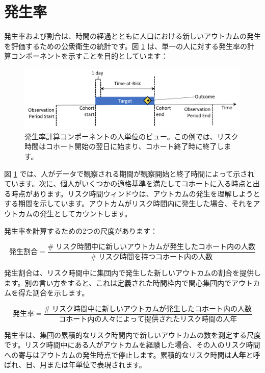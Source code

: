 \documentclass[
  11pt]{book}
\theoremstyle{definition}
\theoremstyle{definition}
\theoremstyle{definition}
\theoremstyle{definition}
\theoremstyle{remark}
\begin{document}
\section{発生率}\label{ux767aux751fux7387}

発生率および割合は、時間の経過とともに人口における新しいアウトカムの発生を評価するための公衆衛生の統計です。図 \ref{fig:incidenceTimeline} は、単一の人に対する発生率の計算コンポーネントを示すことを目的としています： 

\begin{figure}

{\centering \includegraphics[width=1\linewidth]{images/Characterization/incidenceTimeline} 

}

\caption{発生率計算コンポーネントの人単位のビュー。この例では、リスク時間はコホート開始の翌日に始まり、コホート終了時に終了します。}\label{fig:incidenceTimeline}
\end{figure}

図 \ref{fig:incidenceTimeline} では、人がデータで観察される期間が観察開始と終了時間によって示されています。次に、個人がいくつかの適格基準を満たしてコホートに入る時点と出る時点があります。リスク時間ウィンドウは、アウトカムの発生を理解しようとする期間を示しています。アウトカムがリスク時間内に発生した場合、それをアウトカムの発生としてカウントします。

発生率を計算するための2つの尺度があります：

\[
発生割合 = \frac{\#\;リスク時間中に新しいアウトカムが発生したコホート内の人数}{\#\;リスク時間を持つコホート内の人数}
\]

発生割合は、リスク時間中に集団内で発生した新しいアウトカムの割合を提供します。別の言い方をすると、これは定義された時間枠内で関心集団内でアウトカムを得た割合を示します。

\[
発生率 = \frac{\#\;リスク時間中に新しいアウトカムが発生したコホート内の人数}{コホート内の人々によって提供されたリスク時間の人年}
\]

発生率は、集団の累積的なリスク時間内で新しいアウトカムの数を測定する尺度です。リスク時間中にある人がアウトカムを経験した場合、その人のリスク時間への寄与はアウトカムの発生時点で停止します。累積的なリスク時間は\textbf{人年}と呼ばれ、日、月または年単位で表現されます。 
\end{document}
